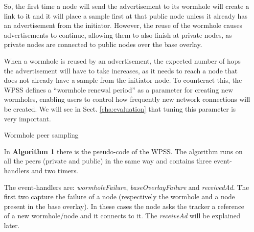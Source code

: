 So, the first time a node will send the advertisement to its wormhole will create a link to it and it will place a sample first at that public node unless it already has an advertisement from the initiator. However, the reuse of the wormhole causes advertisements to continue, allowing them to also finish at private nodes, as private nodes are connected to public nodes over the base overlay. 

When a wormhole is reused by an advertisement, the expected number of hops the advertisement will have to take increases, as it needs to reach a node that does not already have a sample from the initiator node. To counteract this, the WPSS defines a ``wormhole renewal period'' as a parameter for creating new wormholes, enabling users to control how frequently new network connections will be created. We will see in Sect. \ref{cha:evaluation} that tuning this parameter is very important. 


\begin{algorithm}[H]






 \caption{Wormhole peer sampling}
\end{algorithm}

In \textbf{Algorithm 1} there is the pseudo-code of the WPSS. The algorithm runs on all the peers (private and public) in the same way and contains three event-handlers and two timers. 

The event-handlers are: \textit{wormholeFailure}, \textit{baseOverlayFailure} and \textit{receivedAd}. The first two capture the failure of a node (respectively the wormhole and a node present in the base overlay). In these cases the node asks the tracker a reference of a new wormhole/node and it connects to it. The \textit{receiveAd} will be explained later.

